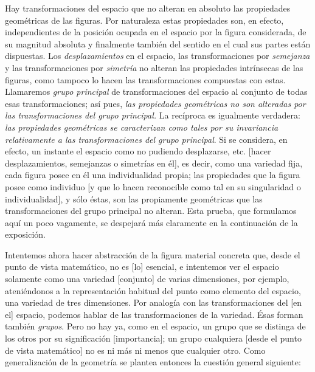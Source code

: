 \documentclass[a4paper, 12pt]{article}
\begin{document}
Hay transformaciones del espacio que no alteran en absoluto las propiedades geométricas de las figuras. Por naturaleza estas propiedades son, en efecto, independientes de la posición ocupada en el espacio por la figura considerada, de su magnitud absoluta y finalmente también del sentido en el cual sus partes están dispuestas. Los \textit{desplazamientos} en el espacio, las transformaciones por \textit{semejanza} y las transformaciones por \textit{simetría} no alteran las propiedades intrínsecas de las figuras, como tampoco lo hacen las transformaciones compuestas con estas. Llamaremos \textit{grupo principal} de transformaciones del espacio al conjunto de todas esas transformaciones; así pues, \textit{las propiedades geométricas no son alteradas por las transformaciones del grupo principal. }La recíproca es igualmente verdadera: \textit{las propiedades geométricas se caracterizan como tales por su invariancia relativamente a las transformaciones del grupo principal}$.$ Si se considera, en efecto, un instante el espacio como no pudiendo desplazarse, etc. [hacer desplazamientos, semejanzas o simetrías en él], es decir, como una variedad fija, cada figura posee en él una individualidad propia; las propiedades que la figura posee como individuo [y que lo hacen reconocible como tal en su singularidad o individualidad], y sólo éstas, son las propiamente geométricas que las transformaciones del grupo principal no alteran. Esta prueba, que formulamos aquí un poco vagamente, se despejará más claramente en la continuación de la exposición.

Intentemos ahora hacer abstracción de la figura material concreta que, desde el punto de vista matemático, no es [lo] esencial, e intentemos ver el espacio solamente como una variedad [conjunto] de varias dimensiones, por ejemplo, ateniéndonos a la representación habitual del punto como elemento del espacio, una variedad de tres dimensiones. Por analogía con las transformaciones del [en el] espacio, podemos hablar de las transformaciones de la variedad. Ésas forman también \textit{grupos}. Pero no hay ya, como en el espacio, un grupo que se distinga de los otros por su significación [importancia]; un grupo cualquiera [desde el punto de vista matemático] no es ni más ni menos que cualquier otro. Como generalización de la geometría se plantea entonces la cuestión general siguiente:
\end{document}
